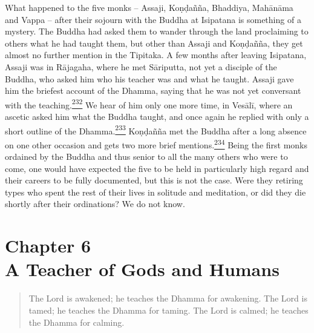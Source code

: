 What happened to the five monks -- Assaji, Koṇḍañña, Bhaddiya, Mahānāma
and Vappa -- after their sojourn with the Buddha at Isipatana is
something of a mystery. The Buddha had asked them to wander through the
land proclaiming to others what he had taught them, but other than
Assaji and Koṇḍañña, they get almost no further mention in the Tipitaka.
A few months after leaving Isipatana, Assaji was in Rājagaha, where he
met Sāriputta, not yet a disciple of the Buddha, who asked him who his
teacher was and what he taught. Assaji gave him the briefest account of
the Dhamma, saying that he was not yet conversant with the
teaching.\label{footprints_split_009.html_fnref232}\hyperref[footprints_split_024.htmlux5cux23fn232]{\textsuperscript{232}}
We hear of him only one more time, in Vesālī, where an ascetic asked him
what the Buddha taught, and once again he replied with only a short
outline of the
Dhamma.\label{footprints_split_009.html_fnref233}\hyperref[footprints_split_024.htmlux5cux23fn233]{\textsuperscript{233}}
Koṇḍañña met the Buddha after a long absence on one other occasion and
gets two more brief
mentions.\label{footprints_split_009.html_fnref234}\hyperref[footprints_split_024.htmlux5cux23fn234]{\textsuperscript{234}}
Being the first monks ordained by the Buddha and thus senior to all the
many others who were to come, one would have expected the five to be
held in particularly high regard and their careers to be fully
documented, but this is not the case. Were they retiring types who spent
the rest of their lives in solitude and meditation, or did they die
shortly after their ordinations? We do not know.

\label{footprints_split_009.html_calibre_pb_19}

\label{footprints_split_010.html}{}

\section{\texorpdfstring{{Chapter 6}\\
A Teacher of Gods and
Humans}{Chapter 6 A Teacher of Gods and Humans}}\label{footprints_split_010.html_TOCTarget6}

\begin{quote}
The Lord is awakened; he teaches the Dhamma for awakening. The Lord is
tamed; he teaches the Dhamma for taming. The Lord is calmed; he teaches
the Dhamma for calming.
\end{quote}

